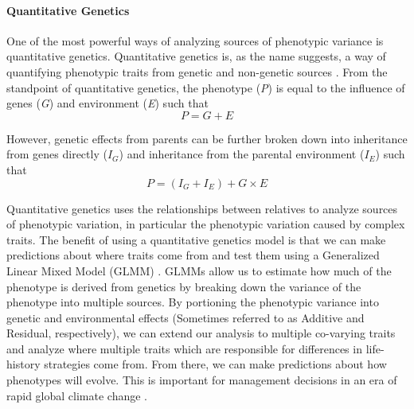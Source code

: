 \documentclass[12pt]{extarticle}
\begin{document}
\paragraph{Quantitative Genetics}
One of the most powerful ways of analyzing sources of phenotypic variance is quantitative genetics. Quantitative genetics is, as the name suggests, a way of quantifying phenotypic traits from genetic and non-genetic sources \citep{Wilson2010}.
From the standpoint of quantitative genetics, the phenotype (\textit{P}) is equal to the influence of genes (\textit{G}) and environment (\textit{E}) such that $$P = G + E $$

However, genetic effects from parents can be further broken down into inheritance from genes directly ($I_G$) and inheritance from the parental environment ($I_E$) such that $$P = (I_G + I_E) + G \times E$$

Quantitative genetics uses the relationships between relatives to analyze sources of phenotypic variation, in particular the phenotypic variation caused by complex traits.
The benefit of using a quantitative genetics model is that we can make predictions about where traits come from and test them using a Generalized Linear Mixed Model (GLMM) \citep{Wilson2010, Bolker2009, VanDooren2016}. GLMMs allow us to estimate how much of the phenotype is derived from genetics by breaking down the variance of the phenotype into multiple sources. By portioning the phenotypic variance into genetic and environmental effects (Sometimes referred to as Additive and Residual, respectively), we can extend our analysis to multiple co-varying traits and analyze where multiple traits which are responsible for differences in life-history strategies come from. From there, we can make predictions about how phenotypes will evolve. This is important for management decisions in an era of rapid global climate change \citep{VanDooren2016}.
\end{document}
